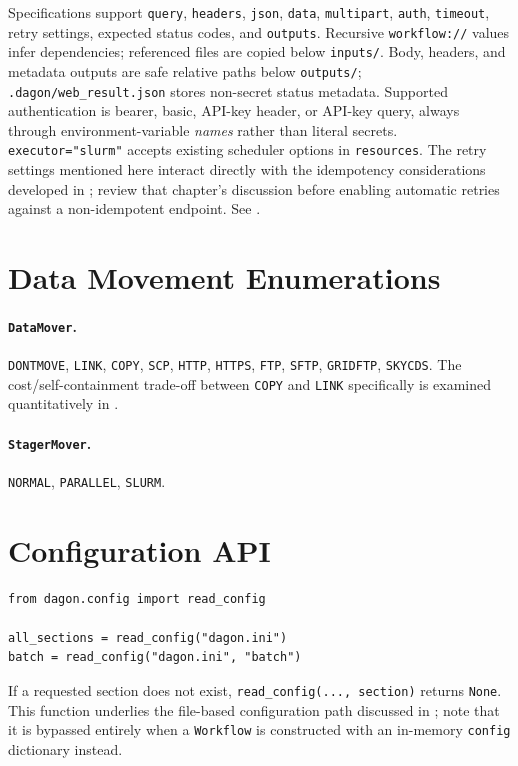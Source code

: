 Specifications support \texttt{query}, \texttt{headers}, \texttt{json},
\texttt{data}, \texttt{multipart}, \texttt{auth}, \texttt{timeout}, retry
settings, expected status codes, and \texttt{outputs}. Recursive
\texttt{workflow://} values infer dependencies; referenced files are copied
below \texttt{inputs/}. Body, headers, and metadata outputs are safe
relative paths below \texttt{outputs/}; \texttt{.dagon/web\_result.json}
stores non-secret status metadata. Supported authentication is bearer,
basic, API-key header, or API-key query, always through environment-variable
\emph{names} rather than literal secrets. \texttt{executor="slurm"} accepts
existing scheduler options in \texttt{resources}. The retry settings
mentioned here interact directly with the idempotency considerations
developed in ; review that chapter's discussion before
enabling automatic retries against a non-idempotent endpoint. See
.

\section{Data Movement Enumerations}

\paragraph{\texttt{DataMover}.} \texttt{DONTMOVE}, \texttt{LINK},
\texttt{COPY}, \texttt{SCP}, \texttt{HTTP}, \texttt{HTTPS}, \texttt{FTP},
\texttt{SFTP}, \texttt{GRIDFTP}, \texttt{SKYCDS}. The cost/self-containment
trade-off between \texttt{COPY} and \texttt{LINK} specifically is examined
quantitatively in .

\paragraph{\texttt{StagerMover}.} \texttt{NORMAL}, \texttt{PARALLEL},
\texttt{SLURM}.

\section{Configuration API}

\begin{lstlisting}
from dagon.config import read_config

all_sections = read_config("dagon.ini")
batch = read_config("dagon.ini", "batch")
\end{lstlisting}

If a requested section does not exist, \texttt{read\_config(..., section)}
returns \texttt{None}. This function underlies the file-based configuration
path discussed in ; note that it is bypassed entirely
when a \texttt{Workflow} is constructed with an in-memory \texttt{config}
dictionary instead.


